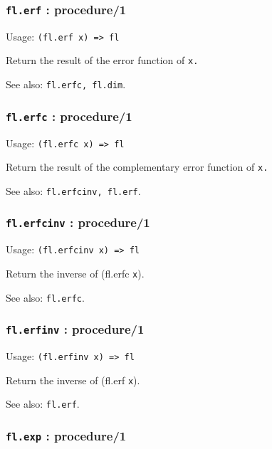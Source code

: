 \documentclass[
]{article}
\newcommand{\passthrough}[1]{#1}
\begin{document}
\hypertarget{fl.erf-procedure1}{%
\subsubsection{\texorpdfstring{\texttt{fl.erf} :
procedure/1}{fl.erf : procedure/1}}\label{fl.erf-procedure1}}

Usage: \passthrough{\lstinline!(fl.erf x) => fl!}

Return the result of the error function of \passthrough{\lstinline!x.!}

See also: \passthrough{\lstinline!fl.erfc, fl.dim!}.

\hypertarget{fl.erfc-procedure1}{%
\subsubsection{\texorpdfstring{\texttt{fl.erfc} :
procedure/1}{fl.erfc : procedure/1}}\label{fl.erfc-procedure1}}

Usage: \passthrough{\lstinline!(fl.erfc x) => fl!}

Return the result of the complementary error function of
\passthrough{\lstinline!x.!}

See also: \passthrough{\lstinline!fl.erfcinv, fl.erf!}.

\hypertarget{fl.erfcinv-procedure1}{%
\subsubsection{\texorpdfstring{\texttt{fl.erfcinv} :
procedure/1}{fl.erfcinv : procedure/1}}\label{fl.erfcinv-procedure1}}

Usage: \passthrough{\lstinline!(fl.erfcinv x) => fl!}

Return the inverse of (fl.erfc \passthrough{\lstinline!x!}).

See also: \passthrough{\lstinline!fl.erfc!}.

\hypertarget{fl.erfinv-procedure1}{%
\subsubsection{\texorpdfstring{\texttt{fl.erfinv} :
procedure/1}{fl.erfinv : procedure/1}}\label{fl.erfinv-procedure1}}

Usage: \passthrough{\lstinline!(fl.erfinv x) => fl!}

Return the inverse of (fl.erf \passthrough{\lstinline!x!}).

See also: \passthrough{\lstinline!fl.erf!}.

\hypertarget{fl.exp-procedure1}{%
\subsubsection{\texorpdfstring{\texttt{fl.exp} :
procedure/1}{fl.exp : procedure/1}}\label{fl.exp-procedure1}}
\end{document}
